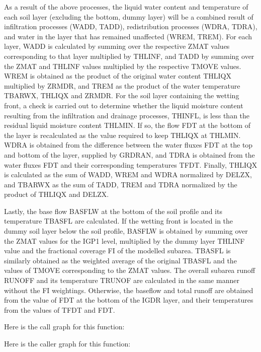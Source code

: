 As a result of the above processes, the liquid water content and temperature of each soil layer (excluding the bottom, dummy layer) will be a combined result of infiltration processes (W\+A\+D\+D, T\+A\+D\+D), redistribution processes (W\+D\+R\+A, T\+D\+R\+A), and water in the layer that has remained unaffected (W\+R\+E\+M, T\+R\+E\+M). For each layer, W\+A\+D\+D is calculated by summing over the respective Z\+M\+A\+T values corresponding to that layer multiplied by T\+H\+L\+I\+N\+F, and T\+A\+D\+D by summing over the Z\+M\+A\+T and T\+H\+L\+I\+N\+F values multiplied by the respective T\+M\+O\+V\+E values. W\+R\+E\+M is obtained as the product of the original water content T\+H\+L\+I\+Q\+X multiplied by Z\+R\+M\+D\+R, and T\+R\+E\+M as the product of the water temperature T\+B\+A\+R\+W\+X, T\+H\+L\+I\+Q\+X and Z\+R\+M\+D\+R. For the soil layer containing the wetting front, a check is carried out to determine whether the liquid moisture content resulting from the infiltration and drainage processes, T\+H\+I\+N\+F\+L, is less than the residual liquid moisture content T\+H\+L\+M\+I\+N. If so, the flow F\+D\+T at the bottom of the layer is recalculated as the value required to keep T\+H\+L\+I\+Q\+X at T\+H\+L\+M\+I\+N. W\+D\+R\+A is obtained from the difference between the water fluxes F\+D\+T at the top and bottom of the layer, supplied by G\+R\+D\+R\+A\+N, and T\+D\+R\+A is obtained from the water fluxes F\+D\+T and their corresponding temperatures T\+F\+D\+T. Finally, T\+H\+L\+I\+Q\+X is calculated as the sum of W\+A\+D\+D, W\+R\+E\+M and W\+D\+R\+A normalized by D\+E\+L\+Z\+X, and T\+B\+A\+R\+W\+X as the sum of T\+A\+D\+D, T\+R\+E\+M and T\+D\+R\+A normalized by the product of T\+H\+L\+I\+Q\+X and D\+E\+L\+Z\+X.

Lastly, the base flow B\+A\+S\+F\+L\+W at the bottom of the soil profile and its temperature T\+B\+A\+S\+F\+L are calculated. If the wetting front is located in the dummy soil layer below the soil profile, B\+A\+S\+F\+L\+W is obtained by summing over the Z\+M\+A\+T values for the I\+G\+P1 level, multiplied by the dummy layer T\+H\+L\+I\+N\+F value and the fractional coverage F\+I of the modelled subarea. T\+B\+A\+S\+F\+L is similarly obtained as the weighted average of the original T\+B\+A\+S\+F\+L and the values of T\+M\+O\+V\+E corresponding to the Z\+M\+A\+T values. The overall subarea runoff R\+U\+N\+O\+F\+F and its temperature T\+R\+U\+N\+O\+F are calculated in the same manner without the F\+I weightings. Otherwise, the baseflow and total runoff are obtained from the value of F\+D\+T at the bottom of the I\+G\+D\+R layer, and their temperatures from the values of T\+F\+D\+T and F\+D\+T.

Here is the call graph for this function\+:




Here is the caller graph for this function\+:


